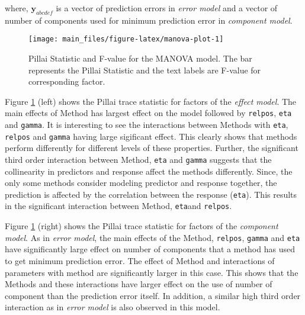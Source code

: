 \documentclass[12pt,3p,authoryear]{elsarticle}
\providecommand{\tightlist}{%
  \setlength{\itemsep}{0pt}\setlength{\parskip}{0pt}}
\begin{document}
where, \(\mathbf{y}_{abcdef}\) is a vector of prediction errors in
\emph{error model} and a vector of number of components used for minimum
prediction error in \emph{component model}.





\begin{figure}
\texttt{[image: main\_files/figure-latex/manova-plot-1]} \caption{Pillai Statistic and F-value for the MANOVA model. The
bar represents the Pillai Statistic and the text labels are F-value for
corresponding factor.}\label{fig:manova-plot}
\end{figure}

\begin{description}
\tightlist
\item[\emph{Error Model}:]
Figure \ref{fig:manova-plot} (left) shows the Pillai trace statistic for
factors of the \emph{effect model}. The main effects of Method has
largest effect on the model followed by \texttt{relpos}, \texttt{eta}
and \texttt{gamma}. It is interesting to see the interactions between
Methods with \texttt{eta}, \texttt{relpos} and \texttt{gamma} having
large sigificant effect. This clearly shows that methods perform
differently for different levels of these properties. Further, the
significant third order interaction between Method, \texttt{eta} and
\texttt{gamma} suggests that the collinearity in predictors and response
affect the methods differently. Since, the only some methods consider
modeling predictor and response together, the prediction is affected by
the correlation between the response (\texttt{eta}). This results in the
significant interaction between Method, \texttt{eta}and \texttt{relpos}.
\item[\emph{Component Model}:]
Figure \ref{fig:manova-plot} (right) shows the Pillai trace statistic
for factors of the \emph{component model}. As in \emph{error model}, the
main effects of the Method, \texttt{relpos}, \texttt{gamma} and
\texttt{eta} have significantly large effect on number of components
that a method has used to get minimum prediction error. The effect of
Method and interactions of parameters with method are significantly
larger in this case. This shows that the Methods and these interactions
have larger effect on the use of number of component than the prediction
error itself. In addition, a similar high third order interaction as in
\emph{error model} is also observed in this model.
\end{description}
\end{document}
